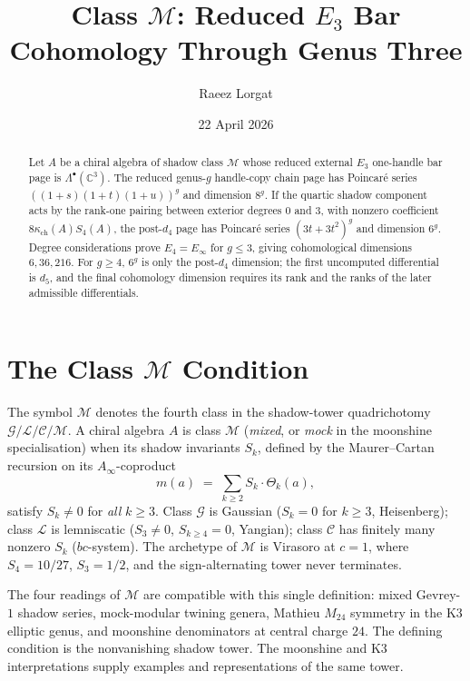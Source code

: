 \documentclass[11pt]{article}
\title{Class $\mathcal{M}$: Reduced $E_3$ Bar Cohomology Through Genus Three}
\author{Raeez Lorgat}
\date{22 April 2026}
\theoremstyle{plain}
\theoremstyle{definition}
\theoremstyle{remark}
\newcommand{\C}{\mathbb{C}}
\newcommand{\kch}{\kappa_{\mathrm{ch}}}
\begin{document}
\maketitle

\begin{abstract}
Let $A$ be a chiral algebra of shadow class $\mathcal{M}$ whose reduced
external $E_3$ one-handle bar page is
$\Lambda^\bullet(\C^3)$. The reduced genus-$g$ handle-copy chain page has
Poincar\'e series
$((1+s)(1+t)(1+u))^g$ and dimension $8^g$. If the quartic shadow component
acts by the rank-one pairing between exterior degrees $0$ and $3$, with
nonzero coefficient $8\kch(A)S_4(A)$, the post-$d_4$ page has Poincar\'e
series $(3t+3t^2)^g$ and dimension $6^g$. Degree considerations prove
$E_4=E_\infty$ for $g\leq 3$, giving cohomological dimensions
$6,36,216$. For $g\geq 4$, $6^g$ is only the post-$d_4$ dimension; the
first uncomputed differential is $d_5$, and the final cohomology dimension
requires its rank and the ranks of the later admissible differentials.
\end{abstract}

\tableofcontents

\section{The Class \texorpdfstring{$\mathcal{M}$}{M} Condition}
\label{sec:what-M-names}

The symbol $\mathcal{M}$ denotes the fourth class in the shadow-tower
quadrichotomy
$\mathcal{G}/\mathcal{L}/\mathcal{C}/\mathcal{M}$. A chiral algebra $A$ is
class $\mathcal{M}$ (\emph{mixed}, or \emph{mock} in the moonshine
specialisation) when its shadow invariants $S_k$, defined by the
Maurer--Cartan recursion on its $A_\infty$-coproduct
\[
 m(a) \;=\; \sum_{k\ge 2} S_k \cdot \Theta_k(a),
\]
satisfy $S_k\ne 0$ for \emph{all} $k\ge 3$. Class $\mathcal{G}$ is Gaussian
($S_k=0$ for $k\ge 3$, Heisenberg); class $\mathcal{L}$ is lemniscatic
($S_3\ne 0$, $S_{k\ge 4}=0$, Yangian); class $\mathcal{C}$ has finitely many
nonzero $S_k$ ($bc$-system). The archetype of $\mathcal{M}$ is Virasoro at
$c=1$, where $S_4=10/27$, $S_3=1/2$, and the sign-alternating tower never
terminates.

The four readings of $\mathcal{M}$ are compatible with this single definition:
mixed Gevrey-$1$ shadow series, mock-modular twining genera, Mathieu
$M_{24}$ symmetry in the K3 elliptic genus, and moonshine denominators at
central charge $24$. The defining condition is the nonvanishing shadow
tower. The moonshine and K3 interpretations supply examples and
representations of the same tower.
\end{document}
